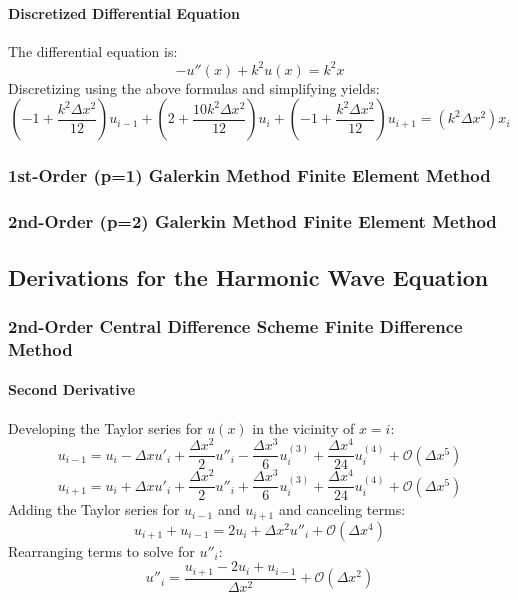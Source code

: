 \documentclass[10pt]{article}		%
\numberwithin{equation}{section}
\begin{document}
\paragraph{Discretized Differential Equation}

The differential equation is:
\begin{equation}
-u''(x)+k^2u(x)=k^2x
\end{equation}
Discretizing using the above formulas and simplifying yields:
\begin{equation}
\left(-1 + \frac{k^2\Delta x^2}{12}\right) u_{i-1} + \left(2 + \frac{10 k^2\Delta x^2}{12}\right) u_{i} + \left(-1+ \frac{k^2\Delta x^2}{12}\right) u_{i+1} = \left(k^2\Delta x^2 \right)x_i
\end{equation}

\subsubsection{1st-Order (p=1) Galerkin Method Finite Element Method}

\subsubsection{2nd-Order (p=2) Galerkin Method Finite Element Method}

\newpage

\subsection{Derivations for the Harmonic Wave Equation}

\subsubsection{2nd-Order Central Difference Scheme Finite Difference Method}

\paragraph{Second Derivative}

Developing the Taylor series for $u(x)$ in the vicinity of $x = i$:
\begin{equation}
u_{i-1} = u_i - \Delta x u'_i + \frac{\Delta x^2}{2} u''_i - \frac{\Delta x^3}{6} u^{(3)}_i + \frac{\Delta x^4}{24} u^{(4)}_i + \mathcal{O}(\Delta x^5)
\end{equation}
\begin{equation}
u_{i+1} = u_i + \Delta x u'_i + \frac{\Delta x^2}{2} u''_i + \frac{\Delta x^3}{6} u^{(3)}_i + \frac{\Delta x^4}{24} u^{(4)}_i + \mathcal{O}(\Delta x^5)
\end{equation}
Adding the Taylor series for $u_{i-1}$ and $u_{i+1}$ and canceling terms:
\begin{equation}
u_{i+1} + u_{i-1} = 2u_i + \Delta x^2 u''_i + \mathcal{O}(\Delta x^4)
\end{equation}
Rearranging terms to solve for $u''_i$:
\begin{equation}
u''_i = \frac{u_{i+1} - 2u_i + u_{i-1}}{\Delta x^2} + \mathcal{O}(\Delta x^2) 
\end{equation}
\end{document}
